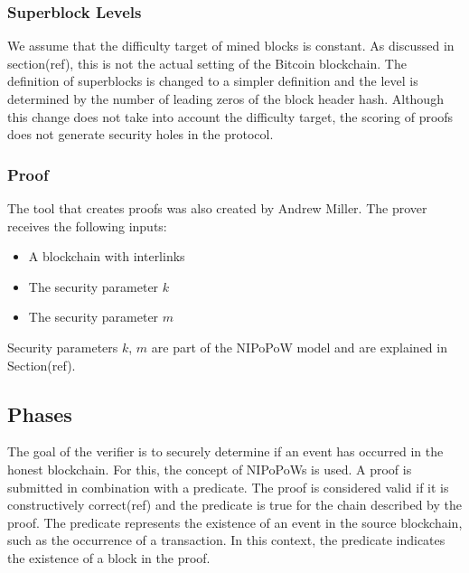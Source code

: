 
\subsubsection{Superblock Levels}

We assume that the difficulty target of mined blocks is constant. As discussed
in section(ref), this is not the actual setting of the Bitcoin blockchain. The
definition of superblocks is changed to a simpler definition and the level is
determined by the number of leading zeros of the block header hash. Although
this change does not take into account the difficulty target, the scoring of
proofs does not generate security holes in the protocol. 

\subsubsection{Proof}

The tool that creates proofs was also created by Andrew Miller. The
prover receives the following inputs:

\begin{itemize}
    \item
        A blockchain with interlinks
    \item
        The security parameter $k$
    \item
        The security parameter $m$
\end{itemize}

Security parameters $k$, $m$ are part of the NIPoPoW model and are explained in
Section(ref).


\subsection{Phases}

The goal of the verifier is to securely determine if an event has occurred in
the honest blockchain. For this, the concept of NIPoPoWs is used. A proof is
submitted in combination with a predicate. The proof is considered valid if it
is constructively correct(ref) and the predicate is true for the chain
described by the proof. The predicate represents the existence of an event
in the source blockchain, such as the occurrence of a transaction. In this
context, the predicate indicates the existence of a block in the proof.

